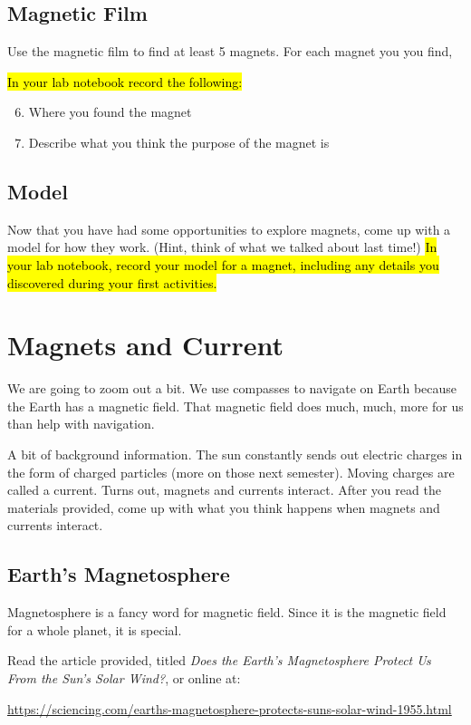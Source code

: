 \documentclass[14pt, fleqn, paper=letter, oneside]{scrartcl}
\begin{document}
\subsection{Magnetic Film}
Use the magnetic film to find at least 5 magnets.
For each magnet you you find,

\hl{In your lab notebook record the following:}
\begin{enumerate}[nosep]
\setcounter{enumi}{5}
\item Where you found the magnet
\item Describe what you think the purpose of the magnet is
\end{enumerate}

\subsection{Model}
Now that you have had some opportunities to explore magnets, come up with a model for how they work.
(Hint, think of what we talked about last time!)
\hl{In your lab notebook, record your model for a magnet, including any details you discovered during your first activities.}



\clearpage
\section{Magnets and Current}
We are going to zoom out a bit.
We use compasses to navigate on Earth because the Earth has a magnetic field.
That magnetic field does much, much, more for us than help with navigation.

A bit of background information.
The sun constantly sends out electric charges in the form of charged particles (more on those next semester).
Moving charges are called a current.
Turns out, magnets and currents interact.
After you read the materials provided, come up with what you think happens when magnets and currents interact.

\subsection{Earth's Magnetosphere}
Magnetosphere is a fancy word for magnetic field.
Since it is the magnetic field for a whole planet, it is special.

Read the article provided, titled \emph{Does the Earth's Magnetosphere Protect Us From the Sun's Solar Wind?}, or online at:

\url{https://sciencing.com/earths-magnetosphere-protects-suns-solar-wind-1955.html}
\end{document}
